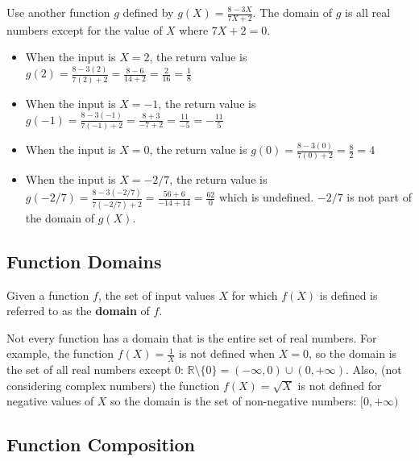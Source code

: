 \documentclass{article}
\begin{document}
Use another function \(g\) defined by \(g(X) = \frac{8 - 3X}{7X + 2}\). The domain of \(g\) is all real numbers except for the value of \(X\) where \(7X + 2 = 0\).
\begin{itemize}
\item When the input is \(X = 2\), the return value is \(g(2) = \frac{8 - 3(2)}{7(2) + 2} = \frac{8 - 6}{14 + 2} = \frac{2}{16} = \frac{1}{8}\)
\item When the input is \(X = -1\), the return value is \(g(-1) = \frac{8 - 3(-1)}{7(-1) + 2} = \frac{8 + 3}{-7 + 2} = \frac{11}{-5} = -\frac{11}{5}\)
\item When the input is \(X = 0\), the return value is \(g(0) = \frac{8 - 3(0)}{7(0) + 2} = \frac{8}{2} = 4\) 
\item When the input is \(X = -2/7\), the return value is \(g(-2/7) = \frac{8 - 3(-2/7)}{7(-2/7) + 2} = \frac{56 + 6}{-14 + 14} = \frac{62}{0}\) which is undefined. \(-2/7\) is not part of the domain of \(g(X)\).
\end{itemize}



\subsection{Function Domains}

Given a function \(f\), the set of input values \(X\) for which \(f(X)\) is defined is referred to as the {\bf domain} of \(f\). 

Not every function has a domain that is the entire set of real numbers. For example, the function \(f(X) = \frac{1}{X}\) is not defined when \(X = 0\), so the domain is the set of all real numbers except \(0\): \(\mathbb{R} \setminus \{0\} = (-\infty, 0) \cup (0, +\infty)\). Also, (not considering complex numbers) the function \(f(X) = \sqrt{X}\) is not defined for negative values of \(X\) so the domain is the set of non-negative numbers: \([0, +\infty)\)


\subsection{Function Composition}
\end{document}
